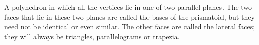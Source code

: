 A polyhedron in which all the vertices lie in one of two parallel planes.
The two faces that lie in these two planes are called the bases of the prismatoid,
but they need not be identical or even similar. The other faces are called
the lateral faces; they will always be triangles, parallelograms or trapezia.
